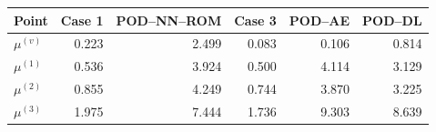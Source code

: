 \begin{tabular}{lrrrrr}
\toprule
Point & Case 1 & POD--NN--ROM & Case 3 & POD--AE & POD--DL \\
\midrule
$\mu^{(v)}$ & 0.223 & 2.499 & 0.083 & 0.106 & 0.814 \\
$\mu^{(1)}$ & 0.536 & 3.924 & 0.500 & 4.114 & 3.129 \\
$\mu^{(2)}$ & 0.855 & 4.249 & 0.744 & 3.870 & 3.225 \\
$\mu^{(3)}$ & 1.975 & 7.444 & 1.736 & 9.303 & 8.639 \\
\bottomrule
\end{tabular}
